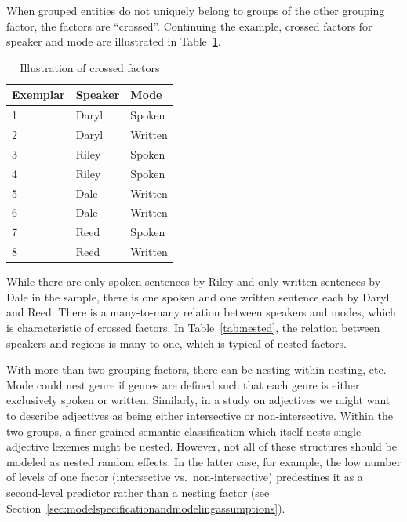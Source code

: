 When grouped entities do not uniquely belong to groups of the other grouping factor, the factors are ``crossed''.
Continuing the example, crossed factors for speaker and mode are illustrated in Table~\ref{tab:crossed}.
%
\begin{table}
  \centering
  \begin{tabular}{lll}
    \toprule
    \textbf{Exemplar} & \textbf{Speaker}  & \textbf{Mode}   \\
    \midrule
                    1 &           Daryl  &         Spoken  \\
                    2 &           Daryl  &         Written \\
                    3 &           Riley  &         Spoken  \\
                    4 &           Riley  &         Spoken  \\
                    5 &           Dale   &         Written \\
                    6 &           Dale   &         Written \\
                    7 &           Reed   &         Spoken  \\
                    8 &           Reed   &         Written \\
    \bottomrule
  \end{tabular}
  \caption{Illustration of crossed factors}
  \label{tab:crossed}
\end{table}
%
While there are only spoken sentences by Riley and only written sentences by Dale in the sample, there is one spoken and one written sentence each by Daryl and Reed.
There is a many-to-many relation between speakers and modes, which is characteristic of crossed factors.
In Table~\ref{tab:nested}, the relation between speakers and regions is many-to-one, which is typical of nested factors.

With more than two grouping factors, there can be nesting within nesting, etc.
Mode could nest genre if genres are defined such that each genre is either exclusively spoken or written.
Similarly, in a study on adjectives we might want to describe adjectives as being either intersective or non-intersective.
Within the two groups, a finer-grained semantic classification which itself nests single adjective lexemes might be nested.
However, not all of these structures should be modeled as nested random effects.
In the latter case, for example, the low number of levels of one factor (intersective vs.\ non-intersective) predestines it as a second-level predictor rather than a nesting factor (see Section~\ref{sec:modelspecificationandmodelingassumptions}).

